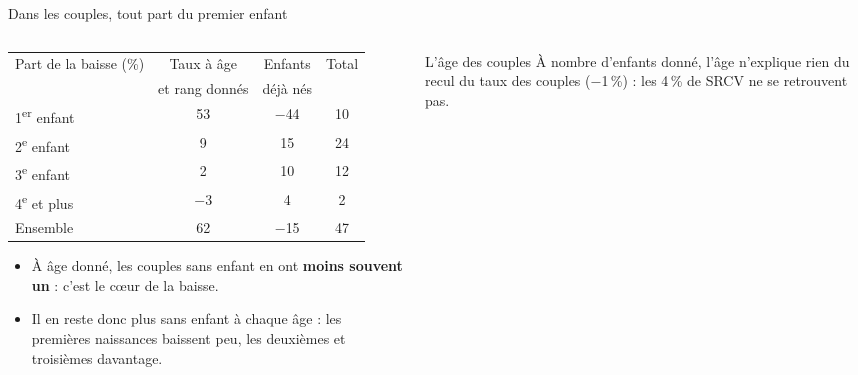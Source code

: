 \documentclass[10pt,aspectratio=169]{beamer}
\begin{document}
\begin{frame}{Dans les couples, tout part du premier enfant}
  \begin{columns}[T]
    \begin{column}{0.58\textwidth}
      \footnotesize\setlength{\tabcolsep}{4pt}
      \begin{tabular}{@{}lccc@{}}
        \toprule
        Part de la baisse (\%) & Taux à âge & Enfants & Total \\
         & et rang donnés & déjà nés & \\
        \midrule
        1\textsuperscript{er} enfant & 53 & $-$44 & 10 \\
        2\textsuperscript{e} enfant & 9 & 15 & 24 \\
        3\textsuperscript{e} enfant & 2 & 10 & 12 \\
        4\textsuperscript{e} et plus & $-$3 & 4 & 2 \\
        \midrule
        Ensemble & 62 & $-$15 & 47 \\
        \bottomrule
      \end{tabular}
      \vspace{0.2cm}

      \small
      \begin{itemize}\setlength{\itemsep}{0.3em}
        \item À âge donné, les couples sans enfant en ont \textbf{moins souvent un} : c'est le cœur de la baisse.
        \item Il en reste donc plus sans enfant à chaque âge : les premières naissances baissent peu, les deuxièmes et troisièmes davantage.
      \end{itemize}
    \end{column}
    \begin{column}{0.38\textwidth}
      \vspace{0.1cm}
      \begin{callout}[tdtenavy]{L'âge des couples}
        \footnotesize\RaggedRight À nombre d'enfants donné, l'âge n'explique rien du recul du taux des couples ($-$1\,\%) : les 4\,\% de SRCV ne se retrouvent pas.
      \end{callout}
    \end{column}
  \end{columns}
\end{frame}
\end{document}
